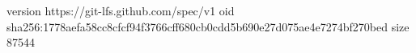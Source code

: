 version https://git-lfs.github.com/spec/v1
oid sha256:1778aefa58cc8cfcf94f3766cff680cb0cdd5b690e27d075ae4e7274bf270bed
size 87544
